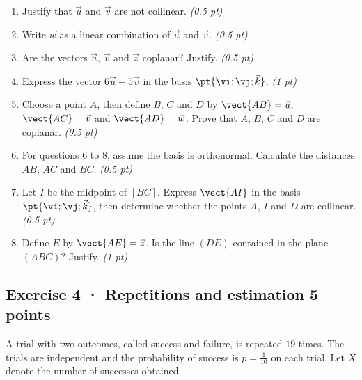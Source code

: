 \begin{enumerate}

\item Justify that $\vec u$ and $\vec v$ are not collinear. \hfill\textit{(0.5 pt)}

\item Write $\vec w$ as a linear combination of $\vec u$ and $\vec v$. \hfill\textit{(0.5 pt)}

\item Are the vectors $\vec u$, $\vec v$ and $\vec z$ coplanar? Justify. \hfill\textit{(0.5 pt)}

\item Express the vector $6\vec u-5\vec v$ in the basis $\pt{\vi;\vj;\vec k}$. \hfill\textit{(1 pt)}

\item Choose a point $A$, then define $B$, $C$ and $D$ by $\vect{AB}=\vec u$, $\vect{AC}=\vec v$ and $\vect{AD}=\vec w$. Prove that $A$, $B$, $C$ and $D$ are coplanar. \hfill\textit{(0.5 pt)}

\item For questions 6 to 8, assume the basis is orthonormal. Calculate the distances $AB$, $AC$ and $BC$. \hfill\textit{(0.5 pt)}

\item Let $I$ be the midpoint of $[BC]$. Express $\vect{AI}$ in the basis $\pt{\vi;\vj;\vec k}$, then determine whether the points $A$, $I$ and $D$ are collinear. \hfill\textit{(0.5 pt)}

\item Define $E$ by $\vect{AE}=\vec z$. Is the line $(DE)$ contained in the plane $(ABC)$? Justify. \hfill\textit{(1 pt)}

\end{enumerate}

\subsection*{Exercise 4 · Repetitions and estimation \hfill 5 points}A trial with two outcomes, called success and failure, is repeated $19$ times. The trials are independent and the probability of success is $p=\frac{1}{10}$ on each trial. Let $X$ denote the number of successes obtained.

